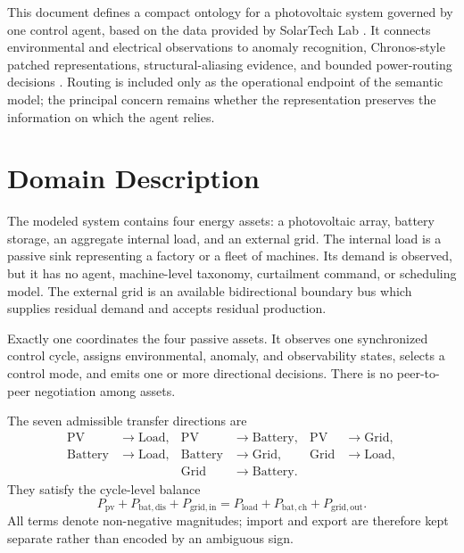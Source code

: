 This document defines a compact ontology for a photovoltaic system governed by one control agent, based on the data provided by SolarTech Lab \autocite{levaPhotovoltaicPowerWeather2020}. It connects environmental and electrical observations to anomaly recognition, Chronos-style patched representations, structural-aliasing evidence, and bounded power-routing decisions \autocite{ansariChronosLearningLanguage2024}. Routing is included only as the operational endpoint of the semantic model; the principal concern remains whether the representation preserves the information on which the agent relies.

\section{Domain Description}

The modeled system contains four energy assets: a photovoltaic array, battery storage, an aggregate internal load, and an external grid. The internal load is a passive sink representing a factory or a fleet of machines. Its demand is observed, but it has no agent, machine-level taxonomy, curtailment command, or scheduling model. The external grid is an available bidirectional boundary bus which supplies residual demand and accepts residual production.

Exactly one  coordinates the four passive assets. It observes one synchronized control cycle, assigns environmental, anomaly, and observability states, selects a control mode, and emits one or more directional decisions. There is no peer-to-peer negotiation among assets.

The seven admissible transfer directions are
\begin{equation}
\label{eq:routes}
\begin{aligned}
\mathrm{PV}&\rightarrow\mathrm{Load}, &
\mathrm{PV}&\rightarrow\mathrm{Battery}, &
\mathrm{PV}&\rightarrow\mathrm{Grid},\\
\mathrm{Battery}&\rightarrow\mathrm{Load}, &
\mathrm{Battery}&\rightarrow\mathrm{Grid}, &
\mathrm{Grid}&\rightarrow\mathrm{Load},\\
&&\mathrm{Grid}&\rightarrow\mathrm{Battery}.&&
\end{aligned}
\end{equation}
They satisfy the cycle-level balance
\begin{equation}
\label{eq:power-balance}
P_{\mathrm{pv}}+P_{\mathrm{bat,dis}}+P_{\mathrm{grid,in}}
=P_{\mathrm{load}}+P_{\mathrm{bat,ch}}+P_{\mathrm{grid,out}}.
\end{equation}
All terms denote non-negative magnitudes; import and export are therefore kept separate rather than encoded by an ambiguous sign.

